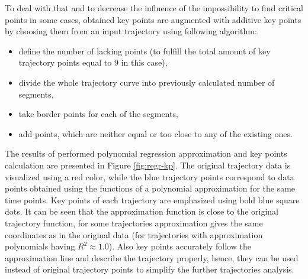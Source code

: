 To deal with that and to decrease the influence of the impossibility to find critical points in some cases, obtained key points are augmented with additive key points by choosing them from an input trajectory using following algorithm:

\begin{itemize}
	\setlength\itemsep{0em}
	\item define the number of lacking points (to fulfill the total amount of key trajectory points equal to 9 in this case),
	\item divide the whole trajectory curve into previously calculated number of segments,
	\item take border points for each of the segments,
	\item add points, which are neither equal or too close to any of the existing ones.
\end{itemize}

The results of performed polynomial regression approximation and key points calculation are presented in Figure \ref{fig:regr-kp}. The original trajectory data is visualized using a red color, while the blue trajectory points correspond to data points obtained using the functions of a polynomial approximation for the same time points. Key points of each trajectory are emphasized using bold blue square dots. It can be seen that the approximation function is close to the original trajectory function, for some trajectories approximation gives the same coordinates as in the original data (for trajectories with approximation polynomials having $R^2 \approx 1.0$). Also key points accurately follow the approximation line and describe the trajectory properly, hence, they can be used instead of original trajectory points to simplify the further trajectories analysis. 

